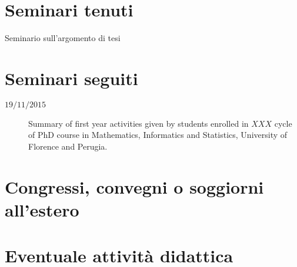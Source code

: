 \documentclass[11pt]{article}
\begin{document}
\section*{Seminari tenuti}

\begin{description}

\item[%
] 

\item[%
Seminario sull'argomento di tesi] 


\end{description}



\section*{Seminari seguiti}

\begin{description}

    \item[$19/11/2015$] Summary of first year activities given by students enrolled in $XXX$ cycle of PhD
        course in Mathematics, Informatics and Statistics, University of Florence and Perugia.

\end{description}


\section*{Congressi, convegni o soggiorni all'estero}

\begin{description}

\item[%
] 

\end{description}


\section*{Eventuale attivit\`a didattica}
\end{document}
